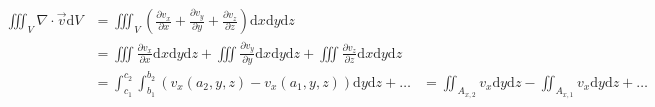 \documentclass{minimal}
\newcommand{\dd}[1]{\text{d}\!#1}
\begin{document}
\begin{displaymath}
\begin{split}
\iiint_V \nabla \cdot \vec v \dd{V} &= \iiint_V \left(\frac{\partial v_x}{\partial x} + \frac{\partial v_y}{\partial y} + \frac{\partial v_z}{\partial z} \right) \dd{x} \dd{y} \dd{z} \\
& = \iiint \frac{\partial v_x}{\partial x} \dd{x} \dd{y} \dd{z} + \iiint \frac{\partial v_y}{\partial y} \dd{x} \dd{y} \dd{z} + \iiint \frac{\partial v_z}{\partial z} \dd{x} \dd{y} \dd{z} \\
& = \int_{c_1}^{c_2} \int_{b_1}^{b_2} (v_x(a_2,y,z) - v_x(a_1,y,z)) \dd{y} \dd{z} + \ldots
& = \iint_{A_{x,2}} v_x \dd{y} \dd{z} - \iint_{A_{x,1}} v_x \dd{y} \dd{z} + \ldots
\end{split}
\end{displaymath}
\end{document}
